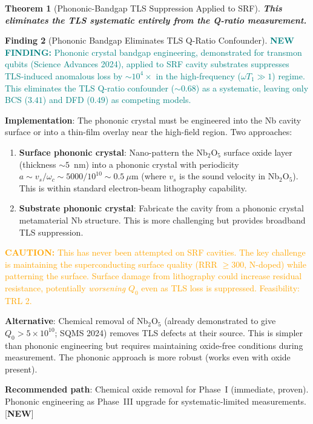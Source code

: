 \documentclass[11pt]{article}
\newcommand{\ee}[1]{\times 10^{#1}}
\newcommand{\caution}[1]{\textcolor{orange}{\textbf{CAUTION:} #1}}
\newcommand{\newfinding}[1]{\textcolor{teal}{\textbf{NEW FINDING:} #1}}
\newtheorem{theorem}{Theorem}[section]
\theoremstyle{definition}
\newtheorem{finding}[theorem]{Finding}
\theoremstyle{remark}
\begin{document}
\begin{theorem}[Phononic-Bandgap TLS Suppression Applied to SRF]
\textbf{This eliminates the TLS systematic entirely from the
Q-ratio measurement.}
\end{theorem}

\begin{finding}[Phononic Bandgap Eliminates TLS Q-Ratio Confounder]
\label{find:phononic}
\newfinding{Phononic crystal bandgap engineering, demonstrated for
transmon qubits (Science Advances 2024), applied to SRF cavity
substrates suppresses TLS-induced anomalous loss by $\sim 10^4\times$
in the high-frequency ($\omega T_1 \gg 1$) regime. This eliminates
the TLS Q-ratio confounder ($\sim 0.68$) as a systematic, leaving
only BCS ($3.41$) and DFD ($0.49$) as competing models.}

\textbf{Implementation}: The phononic crystal must be engineered
into the Nb cavity surface or into a thin-film overlay near the
high-field region. Two approaches:
\begin{enumerate}[nosep]
\item \textbf{Surface phononic crystal}: Nano-pattern the Nb$_2$O$_5$
  surface oxide layer (thickness $\sim 5$~nm) into a phononic crystal
  with periodicity $a \sim v_s/\omega_c \sim 5000/10^{10} \sim
  0.5~\mu$m (where $v_s$ is the sound velocity in Nb$_2$O$_5$).
  This is within standard electron-beam lithography capability.
\item \textbf{Substrate phononic crystal}: Fabricate the cavity
  from a phononic crystal metamaterial Nb structure. This is
  more challenging but provides broadband TLS suppression.
\end{enumerate}

\caution{This has never been attempted on SRF cavities. The key
challenge is maintaining the superconducting surface quality
(RRR $\geq 300$, N-doped) while patterning the surface. Surface
damage from lithography could increase residual resistance,
potentially \emph{worsening} $Q_0$ even as TLS loss is suppressed.
Feasibility: TRL 2.}

\textbf{Alternative}: Chemical removal of Nb$_2$O$_5$ (already
demonstrated to give $Q_0 > 5\ee{10}$; SQMS 2024) removes TLS
defects at their source. This is simpler than phononic engineering
but requires maintaining oxide-free conditions during measurement.
The phononic approach is more robust (works even with oxide present).

\textbf{Recommended path}: Chemical oxide removal for Phase~I
(immediate, proven). Phononic engineering as Phase~III upgrade
for systematic-limited measurements. [\textbf{NEW}]
\end{finding}
\end{document}
